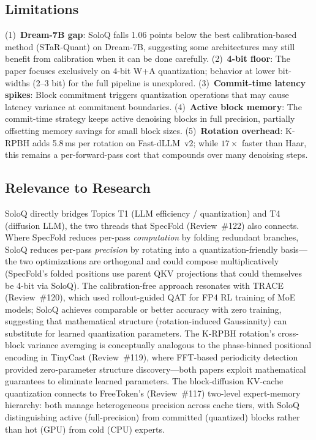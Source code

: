 \documentclass[11pt,a4paper]{article}
\begin{document}
\subsection{Limitations}
(1)~\textbf{Dream-7B gap}: SoloQ falls 1.06 points below the best calibration-based method (STaR-Quant) on Dream-7B, suggesting some architectures may still benefit from calibration when it can be done carefully. (2)~\textbf{4-bit floor}: The paper focuses exclusively on 4-bit W+A quantization; behavior at lower bit-widths (2--3 bit) for the full pipeline is unexplored. (3)~\textbf{Commit-time latency spikes}: Block commitment triggers quantization operations that may cause latency variance at commitment boundaries. (4)~\textbf{Active block memory}: The commit-time strategy keeps active denoising blocks in full precision, partially offsetting memory savings for small block sizes. (5)~\textbf{Rotation overhead}: K-RPBH adds 5.8\,ms per rotation on Fast-dLLM~v2; while $17\times$ faster than Haar, this remains a per-forward-pass cost that compounds over many denoising steps.

\subsection{Relevance to Research}
SoloQ directly bridges Topics T1 (LLM efficiency / quantization) and T4 (diffusion LLM), the two threads that SpecFold (Review~\#122) also connects. Where SpecFold reduces per-pass \emph{computation} by folding redundant branches, SoloQ reduces per-pass \emph{precision} by rotating into a quantization-friendly basis---the two optimizations are orthogonal and could compose multiplicatively (SpecFold's folded positions use parent QKV projections that could themselves be 4-bit via SoloQ). The calibration-free approach resonates with TRACE (Review~\#120), which used rollout-guided QAT for FP4 RL training of MoE models; SoloQ achieves comparable or better accuracy with zero training, suggesting that mathematical structure (rotation-induced Gaussianity) can substitute for learned quantization parameters. The K-RPBH rotation's cross-block variance averaging is conceptually analogous to the phase-binned positional encoding in TinyCast (Review~\#119), where FFT-based periodicity detection provided zero-parameter structure discovery---both papers exploit mathematical guarantees to eliminate learned parameters. The block-diffusion KV-cache quantization connects to FreeToken's (Review~\#117) two-level expert-memory hierarchy: both manage heterogeneous precision across cache tiers, with SoloQ distinguishing active (full-precision) from committed (quantized) blocks rather than hot (GPU) from cold (CPU) experts.
\end{document}
